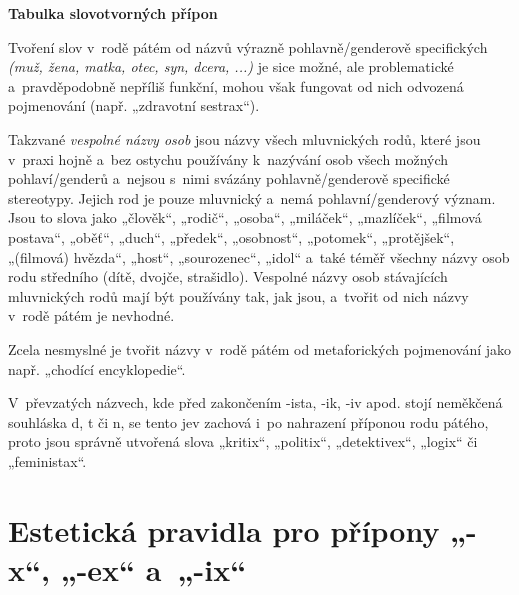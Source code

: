 \begin{table}
{\begin{longtabu}{|X[1,R]|X[1,R]|X[3,L]|X[3,L]|}
%
\end{longtabu}}
\begin{center}\bfseries Tabulka slovotvorných přípon\end{center}
\end{table}

Tvoření slov v rodě pátém od názvů výrazně pohlavně/genderově
specifických \emph{(muž, žena, matka, otec, syn, dcera, ...)}
je sice možné, ale problematické a pravděpodobně nepříliš funkční,
mohou však fungovat od nich odvozená pojmenování (např. „zdravotní sestrax“).

Takzvané \emph{vespolné názvy osob} jsou názvy všech mluvnických rodů,
které jsou v praxi hojně a bez ostychu používány
k nazývání osob všech možných pohlaví/genderů a nejsou s nimi svázány
pohlavně/genderově specifické stereotypy. Jejich rod je pouze mluvnický
a nemá pohlavní/genderový význam. Jsou to slova jako
„člověk“, „rodič“, „osoba“, „miláček“, „mazlíček“, „filmová postava“,
„oběť“, „duch“, „předek“, „osobnost“, „potomek“, „protějšek“,
„(filmová) hvězda“, „host“, „sourozenec“, „idol“
a také téměř všechny názvy osob rodu středního (dítě, dvojče, strašidlo).
Vespolné názvy osob stávajících mluvnických rodů mají být používány tak,
jak jsou, a tvořit od nich názvy v rodě pátém je nevhodné.

Zcela nesmyslné je tvořit názvy v rodě pátém od metaforických pojmenování
jako např. „chodící encyklopedie“.


V převzatých názvech, kde před zakončením -ista, -ik, -iv apod. stojí
neměkčená souhláska d, t či n, se tento jev zachová i po nahrazení
příponou rodu pátého, proto jsou správně utvořená slova
„kritix“, „politix“, „detektivex“, „logix“ či „feministax“.


\section{Estetická pravidla pro přípony „-x“, „-ex“ a „-ix“}

